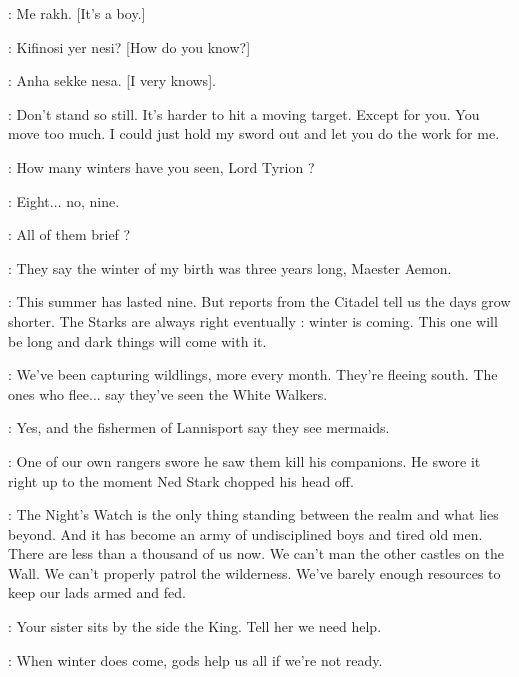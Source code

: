 
\DAENERYS: Me rakh. [It's a boy.] 

\DROGO: Kifinosi yer nesi? [How do you know?] 

\DAENERYS: Anha sekke nesa. [I very knows].

\scene



\JON: Don't stand so still. It's harder to hit a moving target.  Except for you. You move too much. I could just hold my sword out and let you do the work for me. 

\AEMON: How many winters have you seen, Lord Tyrion ? 

\TYRION: Eight$\ldots$ no, nine. 

\AEMON: All of them brief ? 

\TYRION: They say the winter of my birth was three years long, Maester Aemon. 

\AEMON: This summer has lasted nine. But reports from the Citadel tell us the days grow shorter. The Starks are always right eventually : winter is coming. This one will be long and dark things will come with it. 

\JEOR: We've been capturing wildlings, more every month. They're fleeing south. The ones who flee$\ldots$ say they've seen the White Walkers. 

\TYRION: Yes, and the fishermen of Lannisport say they see mermaids. 

\JEOR: One of our own rangers swore he saw them kill his companions. He swore it right up to the moment Ned Stark chopped his head off. 

\AEMON: The Night's Watch is the only thing standing between the realm and what lies beyond. And it has become an army of undisciplined boys and tired old men. There are less than a thousand of us now. We can't man the other castles on the Wall. We can't properly patrol the wilderness. We've barely enough resources to keep our lads armed and fed. 

\JEOR: Your sister sits by the side the King. Tell her we need help. 

\AEMON: When winter does come, gods help us all if we're not ready. 


